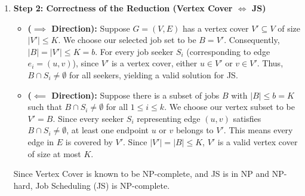 \documentclass[12pt,a4paper]{article}
\makeatletter
\newtheorem*{solution}{Solution}
\theoremstyle{definition}
\renewenvironment{solution}[1][Solution] {\par\pushQED{\qed}\normalfont\topsep6\p@\@plus6\p@\relax\trivlist\item[\hskip\labelsep\bfseries#1\@addpunct{.}]\ignorespaces}{\popQED\endtrivlist\@endpefalse} \makeatother
\makeatother
\begin{document}
\begin{enumerate}
\begin{enumerate}
\begin{solution}
        \textbf{Step 2: Correctness of the Reduction (Vertex Cover $\iff$ JS)}
        \begin{itemize}
            \item \textbf{($\implies$ Direction):} Suppose $G = (V, E)$ has a vertex cover $V' \subseteq V$ of size $|V'| \le K$. We choose our selected job set to be $B = V'$. Consequently, $|B| = |V'| \le K = b$. For every job seeker $S_i$ (corresponding to edge $e_i = (u, v)$), since $V'$ is a vertex cover, either $u \in V'$ or $v \in V'$. Thus, $B \cap S_i \neq \emptyset$ for all seekers, yielding a valid solution for JS.
            \item \textbf{($\impliedby$ Direction):} Suppose there is a subset of jobs $B$ with $|B| \le b = K$ such that $B \cap S_i \neq \emptyset$ for all $1 \le i \le k$. We choose our vertex subset to be $V' = B$. Since every seeker $S_i$ representing edge $(u, v)$ satisfies $B \cap S_i \neq \emptyset$, at least one endpoint $u$ or $v$ belongs to $V'$. This means every edge in $E$ is covered by $V'$. Since $|V'| = |B| \le K$, $V'$ is a valid vertex cover of size at most $K$.
        \end{itemize}
        Since Vertex Cover is known to be NP-complete, and JS is in NP and NP-hard, Job Scheduling (JS) is NP-complete.
        \end{solution}
    \end{enumerate}

\end{enumerate}
\end{document}
